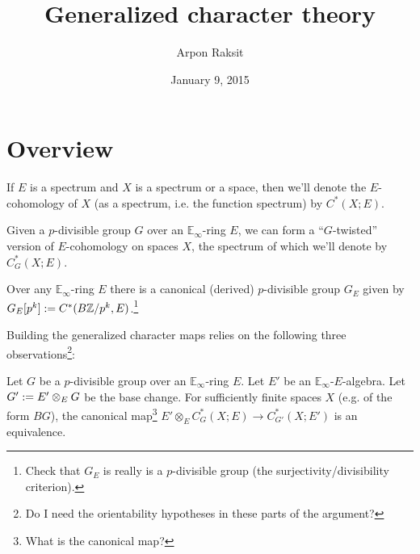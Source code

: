 



\title{Generalized character theory}
\author{Arpon Raksit}
\date{January 9, 2015}


\maketitle
\thispagestyle{fancy}


\section{Overview}

\renewcommand{\E}{\mathbb{E}}
\renewcommand{\G}{G}
\renewcommand{\L}{\mathcal{L}}

\begin{notation}
  If $E$ is a spectrum and $X$ is a spectrum or a space, then we'll
  denote the $E$-cohomology of $X$ (as a spectrum, i.e. the function
  spectrum) by $C^*(X;E)$.
\end{notation}

\begin{definition}
  Given a $p$-divisible group $\G$ over an $\E_\infty$-ring $E$, we
  can form a ``$\G$-twisted'' version of $E$-cohomology on spaces $X$,
  the spectrum of which we'll denote by $C_\G^*(X;E)$.
\end{definition}

\begin{definition}
  Over any $\E_\infty$-ring $E$ there is a canonical (derived)
  $p$-divisible group $\G_E$ given by
  $\G_E[p^k] \ce C^*(B\Z/p^k, E)$.\footnote{Check that $\G_E$ is
    really is a $p$-divisible group (the surjectivity/divisibility
    criterion).}
\end{definition}

Building the generalized character maps relies on the following three
observations\footnote{Do I need the orientability hypotheses in these
  parts of the argument?}:

\begin{theorem}
  \label{base-change}
  Let $\G$ be a $p$-divisible group over an $\E_\infty$-ring $E$. Let
  $E'$ be an $\E_\infty$-$E$-algebra. Let $\G' \ce E' \otimes_E \G$ be
  the base change. For sufficiently finite spaces $X$ (e.g. of the
  form $BG$), the canonical map\footnote{What is the canonical map?}
  $E' \otimes_E C_\G^*(X;E) \to C_{\G'}^*(X;E')$ is an equivalence.
\end{theorem}

